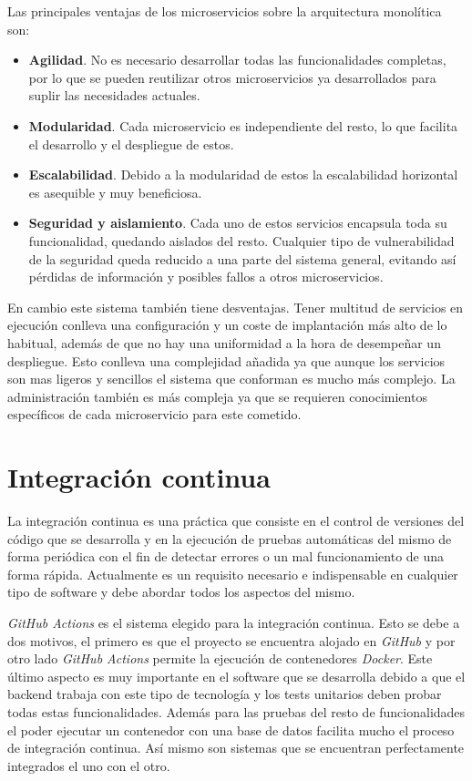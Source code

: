 Las principales ventajas de los microservicios sobre la arquitectura monolítica son:
\begin{itemize}
	\item \textbf{Agilidad}. No es necesario desarrollar todas las funcionalidades completas, por lo que se pueden reutilizar otros microservicios ya desarrollados para suplir las necesidades actuales.
	\item \textbf{Modularidad}. Cada microservicio es independiente del resto, lo que facilita el desarrollo y el despliegue de estos.
	\item \textbf{Escalabilidad}. Debido a la modularidad de estos la escalabilidad horizontal es asequible y muy beneficiosa.
	\item \textbf{Seguridad y aislamiento}. Cada uno de estos servicios encapsula toda su funcionalidad, quedando aislados del resto. Cualquier tipo de vulnerabilidad de la seguridad queda reducido a una parte del sistema general, evitando así pérdidas de información y posibles fallos a otros microservicios.
\end{itemize}

En cambio este sistema también tiene desventajas. Tener multitud de servicios en ejecución conlleva una configuración y un coste de implantación más alto de lo habitual, además de que no hay una uniformidad a la hora de desempeñar un despliegue. Esto conlleva una complejidad añadida ya que aunque los servicios son mas ligeros y sencillos el sistema que conforman es mucho más complejo. La administración también es más compleja ya que se requieren conocimientos específicos de cada microservicio para este cometido.


\section{Integración continua}

La integración continua es una práctica que consiste en el control de versiones del código que se desarrolla y en la ejecución de pruebas automáticas del mismo de forma periódica con el fin de detectar errores o un mal funcionamiento de una forma rápida. Actualmente es un requisito necesario e indispensable en cualquier tipo de software y debe abordar todos los aspectos del mismo.

\textit{GitHub Actions} es el sistema elegido para la integración continua. Esto se debe a dos motivos, el primero es que el proyecto se encuentra alojado en \textit{GitHub} y por otro lado \textit{GitHub Actions} permite la ejecución de contenedores \textit{Docker}. Este último aspecto es muy importante en el software que se desarrolla debido a que el backend trabaja con este tipo de tecnología y los tests unitarios deben probar todas estas funcionalidades. Además para las pruebas del resto de funcionalidades el poder ejecutar un contenedor con una base de datos facilita mucho el proceso de integración continua. Así mismo son sistemas que se encuentran perfectamente integrados el uno con el otro.

